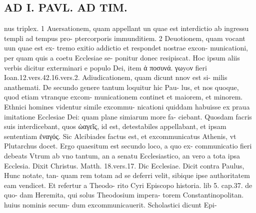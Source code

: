 \documentclass{article}
\begin{document}
\begin{pages}
\section*{AD I. PAVL. AD TIM. }
\marginpar{[ p.332 ]}\pstart nus triplex. 1 Auersationem, quam appellant un quae est interdictio ab ingressu templi ad tempus pro- ptercorporis immunditiem. 2 Deuotionem, quam vocant uun quae est ex- tremo exitio addictio et respondet nostrae excon- municationi, per quam quis a coetu Ecclesiae se- ponitur donec resipiscat. Hoc ipsum aliis verbis dicitur exterminari e populo Dei, item ἀ ποσυνά. γωyoν fieri Ioan.12.vers.42.16.vers.2. Adiudicationem, quam dicunt nnov est si- milis anathemati. De secundo genere tantum loquitur hic Pau- lus, et nos quoque, quod etiam vtranque excom- municationem continet et maiorem, et minorem. Ethnici homines videntur simile excommu- nicationi quiddam habuisse ex praua imitatione Ecclesiae Dei: quam plane simiarum more fa- ciebant. Quosdam facris suis interdicebant, quos ὠαγεῖς, id est, detestabiles appellabant, et ipsam sententiam ἐναγός. Sic Alcibiades factus est, et excommunicatus Athenis, vt Plutarchus docet. Ergo quaesitum est secundo loco, a quo ex- communicatio fieri debeats Vtrum ab vno tantum, an a senatu Ecclesiastico, an vero a tota ipsa Ecclesia. Dixit Christus. Matth. 18.vers.17. Dic Ecclesiae. Dicit contra Paulus, Hunc notate, tan- quam rem totam ad se deferri velit, sibique ipse authoritatem eam vendicet. Et refertur a Theodo- rito Cyri Episcopo historia. lib 5. cap.37. de quo- dam Heremita, qui solus Theodosium impera- torem Constantinopolitan. huius nominis secum- dum excommunicauerit. Scholastici dicunt Epi-  \pend

\end{pages}
\end{document}
